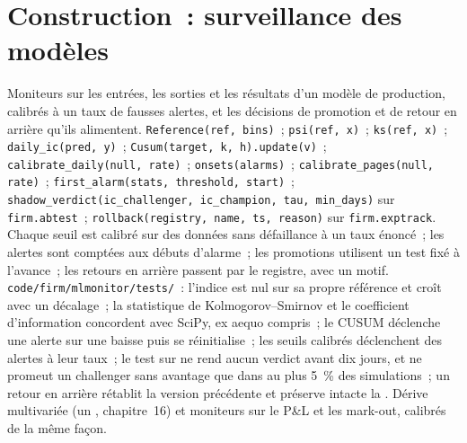 \section{Construction~: surveillance des modèles}\label{bld:ml:monitoring-and-retraining:mlmonitor}

\begin{build}
 Moniteurs sur les entrées, les sorties et les résultats d'un modèle de production, calibrés à un taux de fausses alertes, et les
décisions de promotion et de retour en arrière qu'ils alimentent.
 \texttt{Reference(ref, bins)}~; \texttt{psi(ref, x)}~; \texttt{ks(ref, x)}~; \texttt{daily\_ic(pred, y)}~;
\texttt{Cusum(target, k, h).update(v)}~; \texttt{calibrate\_daily(null, rate)}~; \texttt{onsets(alarms)}~;
\texttt{calibrate\_pages(null, rate)}~; \texttt{first\_alarm(stats, threshold, start)}~;
\texttt{shadow\_verdict(ic\_challenger, ic\_champion, tau, min\_days)} sur \texttt{firm.abtest}~; \texttt{rollback(registry, name, ts, reason)} sur \texttt{firm.exptrack}.
 Chaque seuil est calibré sur des données sans défaillance à un taux énoncé~; les alertes sont comptées aux débuts d'alarme~; les promotions
utilisent un test fixé à l'avance~; les retours en arrière passent par le registre, avec un motif.
 \texttt{code/firm/mlmonitor/tests/}~: l'indice est nul sur sa propre référence et croît avec un décalage~; la
statistique de Kolmogorov--Smirnov et le coefficient d'information concordent avec SciPy, ex aequo compris~; le CUSUM déclenche une alerte sur une baisse puis se réinitialise~;
les seuils calibrés déclenchent des alertes à leur taux~; le test sur  ne rend aucun verdict avant dix jours, et ne promeut un challenger sans avantage que dans
au plus 5~\% des simulations~; un retour en arrière rétablit la version précédente et préserve intacte la .
 Dérive multivariée (un , chapitre~16) et moniteurs sur le P\&L et les mark-out, calibrés de la
même façon.
\end{build}

